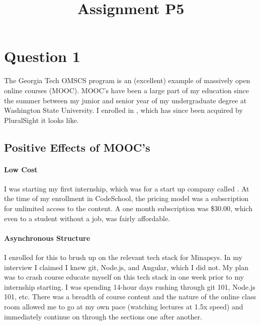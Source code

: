 

\title{Assignment P5\\}



\maketitle
\thispagestyle{fancy}

\section{Question 1}

The Georgia Tech OMSCS program is an (excellent) example of massively open online courses (MOOC). MOOC's have been a large part of my education since the summer between my junior and senior year of my undergraduate degree at Washington State University. I enrolled in , which has since been acquired by PluralSight it looks like.

\subsection{Positive Effects of MOOC's}

\paragraph{Low Cost}
I was starting my first internship, which was for a start up company called . At the time of my enrollment in CodeSchool, the pricing model was a subscription for unlimited access to the content. A one month subscription was \$30.00, which even to a student without a job, was fairly affordable.

\paragraph{Asynchronous Structure}
I enrolled for this to brush up on the relevant tech stack for Minapsys. In my interview I claimed I knew git, Node.js, and Angular, which I did not. My plan was to crash course educate myself on this tech stack in one week prior to my internship starting. I was spending 14-hour days rushing through git 101, Node.js 101, etc. There was a breadth of course content and the nature of the online class room allowed me to go at my own pace (watching lectures at 1.5x speed) and immediately continue on through the sections one after another.

